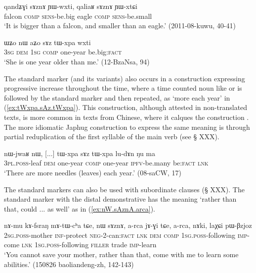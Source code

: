 \begin{exe}
\ex \label{ex:sAznA.YWwxti}
\gll  qandʑɣi sɤznɤ ɲɯ-wxti, qaliaʁ sɤznɤ ɲɯ-xtɕi \\
falcon \textsc{comp} \textsc{sens}-be.big eagle \textsc{comp} \textsc{sens}-be.small \\
\glt `It is bigger than a falcon, and smaller than an eagle.' (2011-08-kuwu, 40-41)
\end{exe}

\begin{exe}
\ex \label{ex:aZo.YWwxti}
\gll ɯʑo nɯ aʑo sɤz tɯ-xpa wxti  \\
\textsc{3sg} \textsc{dem} \textsc{1sg} \textsc{comp} one-year be.big:\textsc{fact} \\
\glt `She is one year older than me.' (12-BzaNsa, 94)
\end{exe}

The standard marker  (and its variants) also occurs in a  construction expressing progressive increase throughout the time, where a time counted noun like  or  is followed by the standard marker and then repeated, as  `more each year' in (\ref{ex:tWxpa.sAz.tWxpa}). This construction, although attested in non-translated texts, is more common in texts from Chinese, where it calques the construction . The more idiomatic Japhug construction to express the same meaning is through partial reduplication of the first syllable of the main verb (see § XXX).
 
 \begin{exe}
 \ex \label{ex:tWxpa.sAz.tWxpa}
 \gll nɯ-jwaʁ nɯ, [...] tɯ-xpa sɤz tɯ-xpa lu-dɤn ŋu ma \\
 \textsc{3pl}.\textsc{poss}-leaf \textsc{dem} { } one-year \textsc{comp} one-year \textsc{ipfv}-be.many be:\textsc{fact} \textsc{lnk} \\
\glt  `There are more needles (leaves) each year.' (08-saCW, 17)
\end{exe}
 
 The standard markers can also be used with subordinate clauses (§ XXX). The standard marker with the distal demonstrative  has the meaning `rather than that, could ... as well' as in (\ref{ex:nW.sAznA.arca}).  
 
 \begin{exe}
 \ex \label{ex:nW.sAznA.arca}
 \gll  nɤ-mu kɤ-fsraŋ mɤ-tɯ-cʰa tɕe, nɯ sɤznɤ, a-rca jɤ-ɣi tɕe, a-rca, nɤki, laχɕi pɯ-βzjoz \\
 \textsc{2sg}.\textsc{poss}-mother \textsc{inf}-protect \textsc{neg}-2-can:\textsc{fact} \textsc{lnk} \textsc{dem} \textsc{comp} \textsc{1sg}.\textsc{poss}-following \textsc{imp}-come \textsc{lnk} \textsc{1sg}.\textsc{poss}-following \textsc{filler} trade \textsc{imp}-learn \\
\glt `You cannot save your mother, rather than that, come with me to learn  some abilities.' (150826 baoliandeng-zh, 142-143)
\end{exe}

